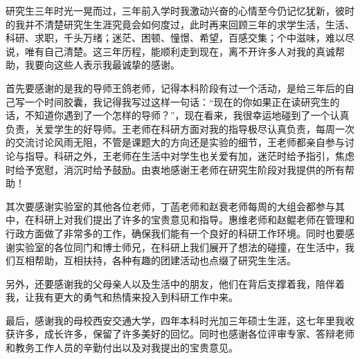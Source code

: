 研究生三年时光一晃而过，三年前入学时我激动兴奋的心情至今仍记忆犹新，彼时的我并不清楚研究生生涯究竟会如何度过，此时再来回顾三年的求学生活，生活、科研、求职，千头万绪；迷茫、困顿、憧憬、希望，百感交集；个中滋味，难以尽说，唯有自己清楚。这三年历程，能顺利走到现在，离不开许多人对我的真诚帮助，我要向这些人表示我最诚挚的感谢。

首先要感谢的是我的导师王鸽老师，记得本科阶段有过一个活动，是给三年后的自己写一个时间胶囊，我记得我写过这样一句话：“现在的你如果正在读研究生的话，不知道你遇到了一个怎样的导师？”，现在看来，我很幸运地碰到了一个认真负责，关爱学生的好导师。王老师在科研方面对我的指导极尽认真负责，每周一次的交流讨论风雨无阻，不管是课题大的方向还是实验的细节，王老师都亲自参与讨论与指导。科研之外，王老师在生活中对学生也关爱有加，迷茫时给予指引，焦虑时给予宽慰，消沉时给予鼓励。由衷地感谢王老师在研究生阶段对我提供的所有帮助！

其次要感谢实验室的其他各位老师，丁菡老师和赵衰老师每周的大组会都参与其中，在科研上对我们提出了许多的宝贵意见和指导。惠维老师和赵鲲老师在管理和行政方面做了非常多的工作，确保我们能有一个良好的科研工作环境。同时也要感谢实验室的各位同门和博士师兄，在科研上我们展开了想法的碰撞，在生活中，我们互相帮助，互相扶持，各种有趣的团建活动也点缀了研究生生活。

另外，还要感谢我的父母亲人以及生活中的朋友，他们在背后支撑着我，陪伴着我，让我有更大的勇气和热情来投入到科研工作中来。

最后，感谢我的母校西安交通大学，四年本科时光加三年硕士生涯，这七年里我收获许多，成长许多，保留了许多美好的回忆。同时也感谢各位评审专家、答辩老师和教务工作人员的辛勤付出以及对我提出的宝贵意见。





\vspace{\baselineskip}

